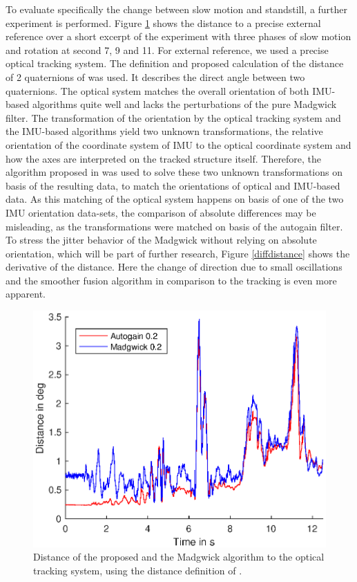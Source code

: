 \documentclass[letterpaper, 10 pt, conference]{ieeeconf}  %
\begin{document}
To evaluate specifically the change between slow motion and standstill, a further experiment is performed.
Figure \ref{distance} shows the distance to a precise external reference over a short excerpt of the experiment with three phases of slow motion and rotation at second 7, 9 and 11. 
For external reference, we used a precise optical tracking system. 
The definition and proposed calculation of the distance of 2 quaternions of \cite{kuffner2004effectiveDistance} was used.
It describes the direct angle between two quaternions.
The optical system matches the overall orientation of both IMU-based algorithms quite well and lacks the perturbations of the pure Madgwick filter.
The transformation of the orientation by the optical tracking system and the IMU-based algorithms yield two unknown transformations, the relative orientation of the coordinate system of IMU to the optical coordinate system and how the axes are interpreted on the tracked structure itself.
Therefore, the algorithm proposed in \cite{dornaika1998calibration} was used to solve these two unknown transformations on basis of the resulting data, to match the orientations of optical and IMU-based data.
As this matching of the optical system happens on basis of one of the two IMU orientation data-sets, the comparison of absolute differences may be misleading, as the transformations were matched on basis of the autogain filter. 
To stress the jitter behavior of the Madgwick without relying on absolute orientation, which will be part of further research, Figure \ref{diffdistance} shows the derivative of the distance.
Here the change of direction due to small oscillations and the smoother fusion algorithm in comparison to the tracking is even more apparent.


\begin{figure}
\includegraphics[width=\linewidth]{./graphics/distance.eps}
\caption{Distance of the proposed and the Madgwick algorithm to the optical tracking system, using the distance definition of \cite{kuffner2004effectiveDistance}.}
\label{distance}
\end{figure}
\end{document}
